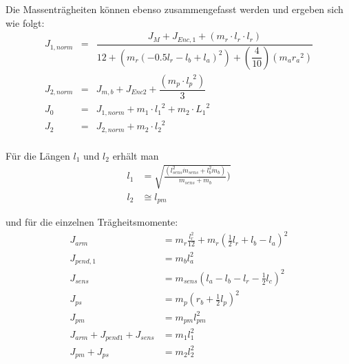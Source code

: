 Die Massenträgheiten können ebenso zusammengefasst werden und ergeben sich wie folgt:
\begin{eqnarray*}
J_{1,norm}&=&\dfrac{J_M +J_{Enc,1}+(m_r \cdot l_r \cdot l_r)}{12+(m_r (-0.5 l_r-l_b+l_a)^2)+(\dfrac{4}{10}) (m_a  {r_a}^{2})} \\
J_{2,norm}&=& J_{m,b}+J_{Enc2}   + \dfrac{(m_p \cdot {l_p}^{2})}{3} \\
J_0&=&J_{1,norm}+ m_1 \cdot {l_1}^{2} + m_2 \cdot {L_1}^{2} \\ 
J_2&=&J_{2,norm}+m_2 \cdot {l_2}^2           \\
\end{eqnarray*}

Für die Längen $l_1$ und $l_2$ erhält man
\begin{align*}
l_1 &= \sqrt{\frac{(l_{sens}^2 \dot m_{sens}+l_b^2 \dot m_b)}{m_{sens} + m_b})} \\
l_2 &\cong l_{pm}
\end{align*}

und für die einzelnen Trägheitsmomente:
\begin{align*}
J_{arm} &= m_r \frac{l^2_r}{12}+m_r(\frac{1}{2}l_r+l_b-l_a)^2 \\
J_{pend,1} &= m_bl^2_a \\
J_{sens} &= m_{sens}(l_a-l_b-l_r-\frac{1}{2}l_c)^2 \\
J_{ps} &= m_p(r_b+\frac{1}{2}l_p)^2 \\
J_{pm} &= m_{pm}l^2_{pm} \\
J_{arm}+J_{pend1}+J_{sens} &= m_1l^2_1 \\ 
J_{pm}+J_{ps} &= m_2l^2_2 \\
\end{align*}

